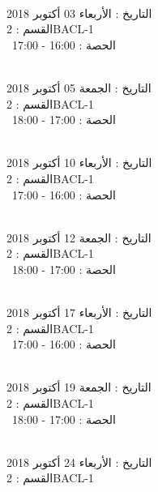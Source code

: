 \noindent\makebox[\linewidth]{\rule{\paperwidth}{0.4pt}}
 \\
التاريخ : الأربعاء 03 أكتوبر 2018 \\
القسم : 2BACL-1 \\
 \  
الحصة : 16:00 - 17:00 \\
\par
\noindent\makebox[\linewidth]{\rule{\paperwidth}{0.4pt}}
 \\
التاريخ : الجمعة 05 أكتوبر 2018 \\
القسم : 2BACL-1 \\
 \  
الحصة : 17:00 - 18:00 \\
\par
\noindent\makebox[\linewidth]{\rule{\paperwidth}{0.4pt}}
 \\
التاريخ : الأربعاء 10 أكتوبر 2018 \\
القسم : 2BACL-1 \\
 \  
الحصة : 16:00 - 17:00 \\
\par
\noindent\makebox[\linewidth]{\rule{\paperwidth}{0.4pt}}
 \\
التاريخ : الجمعة 12 أكتوبر 2018 \\
القسم : 2BACL-1 \\
 \  
الحصة : 17:00 - 18:00 \\
\par
\noindent\makebox[\linewidth]{\rule{\paperwidth}{0.4pt}}
 \\
التاريخ : الأربعاء 17 أكتوبر 2018 \\
القسم : 2BACL-1 \\
 \  
الحصة : 16:00 - 17:00 \\
\par
\noindent\makebox[\linewidth]{\rule{\paperwidth}{0.4pt}}
 \\
التاريخ : الجمعة 19 أكتوبر 2018 \\
القسم : 2BACL-1 \\
 \  
الحصة : 17:00 - 18:00 \\
\par
\noindent\makebox[\linewidth]{\rule{\paperwidth}{0.4pt}}
 \\
التاريخ : الأربعاء 24 أكتوبر 2018 \\
القسم : 2BACL-1 \\

